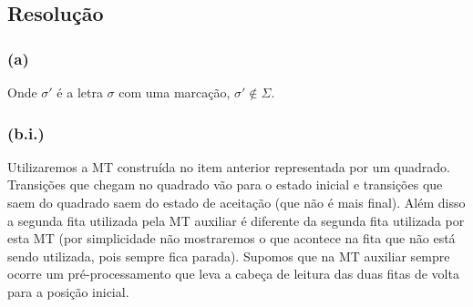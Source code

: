 \documentclass{article}
\begin{document}
\subsection{Resolução}

\subsubsection{(a)}

\begin{center}
\end{center}

Onde $\sigma'$ é a letra $\sigma$ com uma marcação, $\sigma'\not\in\Sigma$.


\subsubsection{(b.i.)}

Utilizaremos a MT construída no item anterior representada por um quadrado. Transições que chegam no quadrado vão para o estado inicial e transições que saem do quadrado saem do estado de aceitação (que não é mais final). Além disso a segunda fita utilizada pela MT auxiliar é diferente da segunda fita utilizada por esta MT (por simplicidade não mostraremos o que acontece na fita que não está sendo utilizada, pois sempre fica parada). Supomos que na MT auxiliar sempre ocorre um pré-processamento que leva a cabeça de leitura das duas fitas de volta para a posição inicial.
\end{document}

